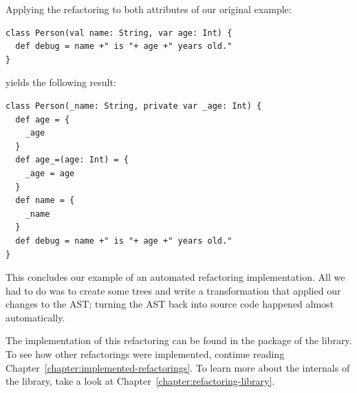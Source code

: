 \documentclass[10pt,a4paper,oneside]{scrreprt}
\begin{document}
Applying the refactoring to both attributes of our original example:

\begin{lstlisting}
class Person(val name: String, var age: Int) {
  def debug = name +" is "+ age +" years old."
}
\end{lstlisting}

yields the following result:

\begin{lstlisting}
class Person(_name: String, private var _age: Int) {
  def age = {
    _age
  }
  def age_=(age: Int) = {
    _age = age
  }
  def name = {
    _name
  }
  def debug = name +" is "+ age +" years old."
}
\end{lstlisting}

This concludes our example of an automated refactoring implementation. All we had to do was to create some trees and write a transformation that applied our changes to the AST; turning the AST back into source code happened almost automatically.

The implementation of this refactoring can be found in the  package of the library. To see how other refactorings were implemented, continue reading Chapter~\vref{chapter:implemented-refactorings}. To learn more about the internals of the library, take a look at Chapter~\vref{chapter:refactoring-library}.





\clearpage
\bib
\end{document}
